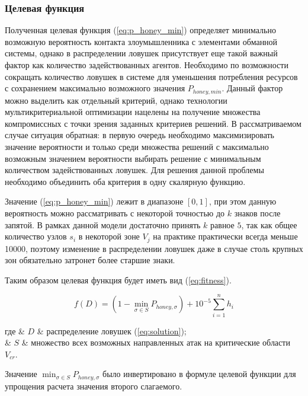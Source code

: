 \subsubsection{Целевая функция}\hspace*{\fill}

Полученная целевая функция (\ref{eq:p_honey_min}) определяет минимально возможную вероятность контакта злоумышленника с элементами обманной системы, однако в распределении ловушек присутствует еще такой важный фактор как количество задействованных агентов. Необходимо по возможности сокращать количество ловушек в системе для уменьшения потребления ресурсов с сохранением максимально возможного значения $P_{honey, min}$. Данный фактор можно выделить как отдельный критерий, однако технологии мультикритериальной оптимизации нацелены на получение множества компромиссных с точки зрения заданных критериев решений. В рассматриваемом случае ситуация обратная: в первую очередь необходимо максимизировать значение вероятности и только среди множества решений с максимально возможным значением вероятности выбирать решение с минимальным количеством задействованных ловушек. Для решения данной проблемы необходимо объединить оба критерия в одну скалярную функцию.

Значение (\ref{eq:p_honey_min}) лежит в диапазоне $[0, 1]$, при этом данную вероятность можно рассматривать с некоторой точностью до $k$ знаков после запятой. В рамках данной модели достаточно принять $k$ равное $5$, так как общее количество узлов $s_i$ в некоторой зоне $V_j$ на практике практически всегда меньше 10000, поэтому изменение в распределении ловушек  даже в случае столь крупных зон обязательно затронет более старшие знаки.

Таким образом целевая функция будет иметь вид (\ref{eq:fitness}).

\begin{equation}
\label{eq:fitness}
f(D) = (1 - \min_{\sigma \in S} P_{honey, \sigma}) + 10^{-5} \sum_{i=1}^n h_i
\end{equation}
\begin{explanation}
где & $D$ & распределение ловушек (\ref{eq:solution}); \\
	& $S$ & множество всех возможных направленных атак на критические области $V_{cr}$. \\
\end{explanation}

Значение $\min_{\sigma \in S} P_{honey, \sigma}$ было инвертировано в формуле целевой функции для упрощения расчета значения второго слагаемого.

